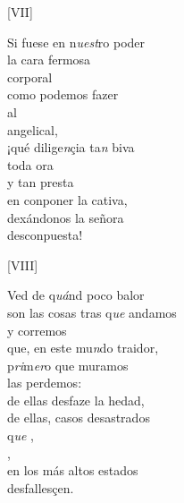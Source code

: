 \documentclass[11pt,a4paper,twoside]{article}
\begin{document}
{\begin{center}
	[VII]
\end{center}
\pstart
Si fuese en n\textit{uest}ro poder\\
 la cara fermosa\\
corporal\\
como podemos fazer\\
al  \\
angelical,\\
¡qué dilige\textit{n}çia ta\textit{n} biva\\
 toda ora\\
y tan presta\\
en conponer la cativa,\\
dexándonos la señora\\
desconpuesta!
\pend

\begin{center}
	[VIII]
\end{center}
\pstart
Ved de q\textit{uá}nd poco balor\\
son las cosas tras q\textit{ue} andamos\\
y corremos\\
que, en este mu\textit{n}do traidor,\\
 p\textit{ri}m\textit{er}o que muramos\\
las perdemos:\\
de ellas desfaze la hedad,\\
de ellas, casos desastrados\\
q\textit{ue} ,\\
,\\
en los más altos estados\\
desfallesçen.
\pend

}
\end{document}
